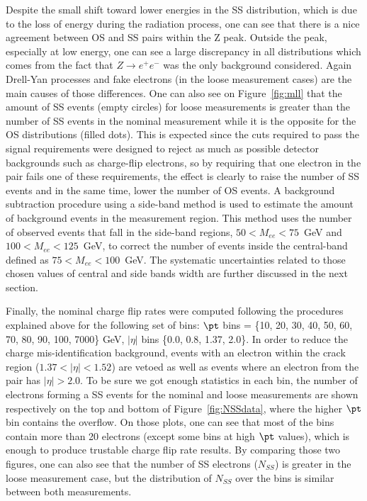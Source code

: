 Despite the small shift toward lower energies in the SS distribution, which is due to the loss of energy during the radiation process, 
one can see that there is a nice agreement between OS and SS pairs within the Z peak. 
Outside the peak, especially at low energy, one can see a large discrepancy in all distributions which comes from the fact 
that $Z\to e^+e^-$ was the only background considered. 
Again Drell-Yan processes and fake electrons (in the loose measurement cases) are the main causes of those differences. 
One can also see on Figure~\ref{fig:mll} that the amount of SS events (empty circles) for loose measurements is greater 
than the number of SS events in the nominal measurement while it is the opposite for the OS distributions (filled dots). 
This is expected since the cuts required to pass the signal requirements were designed to reject as much as possible detector backgrounds such as charge-flip electrons, 
so by requiring that one electron in the pair fails one of these requirements, the effect is clearly to raise the number of SS events and in the same time, 
lower the number of OS events. 
A background subtraction procedure using a side-band method is used to estimate the amount of background events in the measurement region. 
This method uses the number of observed events that fall in the side-band regions, $50<M_{ee}<75$~GeV and $100<M_{ee}<125$~GeV, 
to correct the number of events inside the central-band defined as $75<M_{ee}<100$~GeV. The systematic uncertainties related to those chosen values of central and side bands width are further discussed in the next section.


Finally, the nominal charge flip rates were computed following the procedures explained above for the following set of bins: $\pt$ bins = \{10, 20, 30, 40, 50, 60, 70, 80, 90, 100, 7000\} GeV, $|\eta|$ bins \{0.0, 0.8, 1.37, 2.0\}. In order to reduce the charge mis-identification background, events with an electron within the crack region ($1.37<|\eta|<1.52$) are vetoed as well as events where an electron from the pair has $|\eta|>2.0$. To be sure we got enough statistics in each bin, the number of electrons forming a SS events for the nominal and loose measurements are shown respectively on the top and bottom of Figure~\ref{fig:NSSdata}, where the higher $\pt$ bin contains the overflow. On those plots, one can see that most of the bins contain more than 20 electrons (except some bins at high $\pt$ values), which is enough to produce trustable charge flip rate results. By comparing those two figures, one can also see that the number of SS electrons ($N_{SS}$) is greater in the loose measurement case, but the distribution of $N_{SS}$ over the bins is similar between both measurements.

